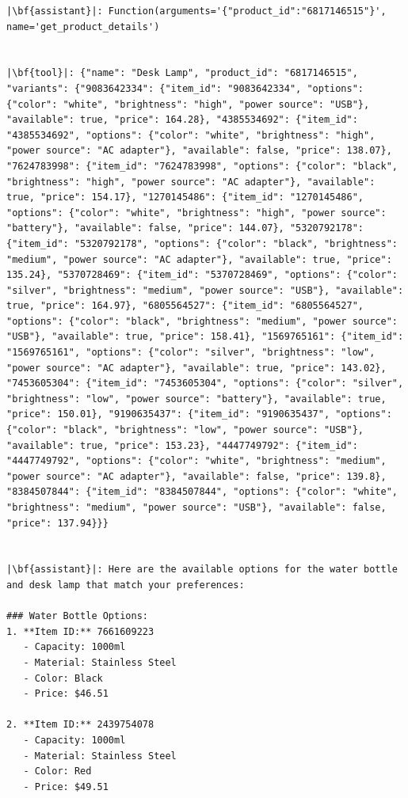 \begin{longlisting}
\begin{verbatim}
|\bf{assistant}|: Function(arguments='{"product_id":"6817146515"}', name='get_product_details')


|\bf{tool}|: {"name": "Desk Lamp", "product_id": "6817146515", "variants": {"9083642334": {"item_id": "9083642334", "options": {"color": "white", "brightness": "high", "power source": "USB"}, "available": true, "price": 164.28}, "4385534692": {"item_id": "4385534692", "options": {"color": "white", "brightness": "high", "power source": "AC adapter"}, "available": false, "price": 138.07}, "7624783998": {"item_id": "7624783998", "options": {"color": "black", "brightness": "high", "power source": "AC adapter"}, "available": true, "price": 154.17}, "1270145486": {"item_id": "1270145486", "options": {"color": "white", "brightness": "high", "power source": "battery"}, "available": false, "price": 144.07}, "5320792178": {"item_id": "5320792178", "options": {"color": "black", "brightness": "medium", "power source": "AC adapter"}, "available": true, "price": 135.24}, "5370728469": {"item_id": "5370728469", "options": {"color": "silver", "brightness": "medium", "power source": "USB"}, "available": true, "price": 164.97}, "6805564527": {"item_id": "6805564527", "options": {"color": "black", "brightness": "medium", "power source": "USB"}, "available": true, "price": 158.41}, "1569765161": {"item_id": "1569765161", "options": {"color": "silver", "brightness": "low", "power source": "AC adapter"}, "available": true, "price": 143.02}, "7453605304": {"item_id": "7453605304", "options": {"color": "silver", "brightness": "low", "power source": "battery"}, "available": true, "price": 150.01}, "9190635437": {"item_id": "9190635437", "options": {"color": "black", "brightness": "low", "power source": "USB"}, "available": true, "price": 153.23}, "4447749792": {"item_id": "4447749792", "options": {"color": "white", "brightness": "medium", "power source": "AC adapter"}, "available": false, "price": 139.8}, "8384507844": {"item_id": "8384507844", "options": {"color": "white", "brightness": "medium", "power source": "USB"}, "available": false, "price": 137.94}}}


|\bf{assistant}|: Here are the available options for the water bottle and desk lamp that match your preferences:

### Water Bottle Options:
1. **Item ID:** 7661609223
   - Capacity: 1000ml
   - Material: Stainless Steel
   - Color: Black
   - Price: $46.51

2. **Item ID:** 2439754078
   - Capacity: 1000ml
   - Material: Stainless Steel
   - Color: Red
   - Price: $49.51


\end{verbatim}
\end{longlisting}

